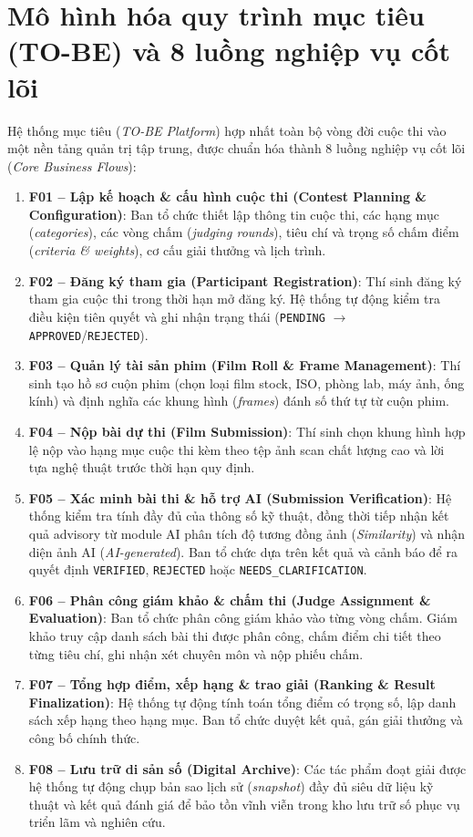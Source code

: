 \section{Mô hình hóa quy trình mục tiêu (TO-BE) và 8 luồng nghiệp vụ cốt lõi}
\label{s:c2_tobe}

Hệ thống mục tiêu (\textit{TO-BE Platform}) hợp nhất toàn bộ vòng đời cuộc thi vào một nền tảng quản trị tập trung, được chuẩn hóa thành 8 luồng nghiệp vụ cốt lõi (\textit{Core Business Flows}):

\begin{enumerate}
    \item \textbf{F01 -- Lập kế hoạch \& cấu hình cuộc thi (Contest Planning \& Configuration)}: Ban tổ chức thiết lập thông tin cuộc thi, các hạng mục (\textit{categories}), các vòng chấm (\textit{judging rounds}), tiêu chí và trọng số chấm điểm (\textit{criteria \& weights}), cơ cấu giải thưởng và lịch trình.
    \item \textbf{F02 -- Đăng ký tham gia (Participant Registration)}: Thí sinh đăng ký tham gia cuộc thi trong thời hạn mở đăng ký. Hệ thống tự động kiểm tra điều kiện tiên quyết và ghi nhận trạng thái (\texttt{PENDING} $\rightarrow$ \texttt{APPROVED}/\texttt{REJECTED}).
    \item \textbf{F03 -- Quản lý tài sản phim (Film Roll \& Frame Management)}: Thí sinh tạo hồ sơ cuộn phim (chọn loại film stock, ISO, phòng lab, máy ảnh, ống kính) và định nghĩa các khung hình (\textit{frames}) đánh số thứ tự từ cuộn phim.
    \item \textbf{F04 -- Nộp bài dự thi (Film Submission)}: Thí sinh chọn khung hình hợp lệ nộp vào hạng mục cuộc thi kèm theo tệp ảnh scan chất lượng cao và lời tựa nghệ thuật trước thời hạn quy định.
    \item \textbf{F05 -- Xác minh bài thi \& hỗ trợ AI (Submission Verification)}: Hệ thống kiểm tra tính đầy đủ của thông số kỹ thuật, đồng thời tiếp nhận kết quả advisory từ module AI phân tích độ tương đồng ảnh (\textit{Similarity}) và nhận diện ảnh AI (\textit{AI-generated}). Ban tổ chức dựa trên kết quả và cảnh báo để ra quyết định \texttt{VERIFIED}, \texttt{REJECTED} hoặc \texttt{NEEDS\_CLARIFICATION}.
    \item \textbf{F06 -- Phân công giám khảo \& chấm thi (Judge Assignment \& Evaluation)}: Ban tổ chức phân công giám khảo vào từng vòng chấm. Giám khảo truy cập danh sách bài thi được phân công, chấm điểm chi tiết theo từng tiêu chí, ghi nhận xét chuyên môn và nộp phiếu chấm.
    \item \textbf{F07 -- Tổng hợp điểm, xếp hạng \& trao giải (Ranking \& Result Finalization)}: Hệ thống tự động tính toán tổng điểm có trọng số, lập danh sách xếp hạng theo hạng mục. Ban tổ chức duyệt kết quả, gán giải thưởng và công bố chính thức.
    \item \textbf{F08 -- Lưu trữ di sản số (Digital Archive)}: Các tác phẩm đoạt giải được hệ thống tự động chụp bản sao lịch sử (\textit{snapshot}) đầy đủ siêu dữ liệu kỹ thuật và kết quả đánh giá để bảo tồn vĩnh viễn trong kho lưu trữ số phục vụ triển lãm và nghiên cứu.
\end{enumerate}

